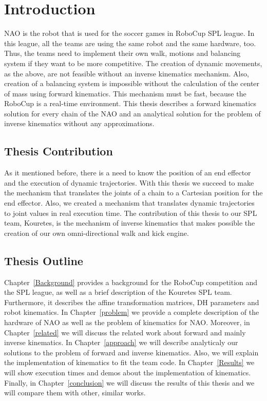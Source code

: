 \chapter{Introduction}
\label{intro}
NAO is the robot that is used for the soccer games in RoboCup SPL league. In this league, all the teams are using the same robot and the same hardware, too. Thus, the teams need to implement their own walk, motions and balancing system if they want to be more competitive. The creation of dynamic movements, as the above, are not feasible without an inverse kinematics mechanism. Also, creation of a balancing system is impossible without the calculation of the center of mass using forward kinematics. This mechanism must be fast, because the RoboCup is a real-time environment. This thesis describes a forward kinematics solution for every chain of the NAO and an analytical solution for the problem of inverse kinematics without any approximations.

\section{Thesis Contribution}
As it mentioned before, there is a need to know the position of an end effector and the execution of dynamic trajectories. With this thesis we succeed to make the mechanism that translates the joints of a chain to a Cartesian position for the end effector. Also, we created a mechanism that translates dynamic trajectories to joint values in real execution time. The contribution of this thesis to our SPL team, Kouretes, is the mechanism of inverse kinematics that makes possible the creation of our own omni-directional walk and kick engine.

\section{Thesis Outline}
Chapter~\ref{Background} provides a background for the RoboCup competition and the SPL league, as well as a brief description of the Kouretes SPL team. Furthermore, it describes the affine transformation matrices, DH parameters and robot kinematics. In Chapter~\ref{problem} we provide a complete description of the hardware of NAO as well as the problem of kinematics for NAO. Moreover, in Chapter~\ref{related} we will discuss the related work about forward and mainly inverse kinematics. In Chapter~\ref{approach} we will describe analyticaly our solutions to the problem of forward and inverse kinematics. Also, we will explain the implementation of kinematics to fit the team code. In Chapter~\ref{Results} we will show execution times and demos about the implementation of kinematics. Finally, in Chapter~\ref{conclusion} we will discuss the results of this thesis and we will compare them with other, similar works.

